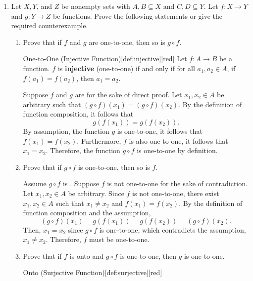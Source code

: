 \begin{enumerate} 
  \item Let $X, Y$, and $Z$ be nonempty sets with $A, B \subseteq X$ and $C, D \subseteq Y$. 
  Let $f: X \rightarrow Y$ and $g: Y \rightarrow Z$ be functions. 
  Prove the following statements or give the required counterexample.
  \begin{enumerate}
    \item Prove that if $f$ and $g$ are one-to-one, then so is $g \circ f$.
    \begin{define}{One-to-One (Injective Function)}[def:injective][red]
      Let $f : A \to B$ be a function. $f$ is \textbf{injective} (one-to-one) if and only if for all $a_1, a_2 \in A$, if $f(a_1) = f(a_2)$, then $a_1 = a_2$.
    \end{define}
    \begin{subprove}
      Suppose $f$ and $g$ are  for the sake of direct proof.\proofstep
      Let $x_1, x_2 \in A$ be arbitrary such that $(g \circ f)(x_1) = (g \circ f)(x_2)$.
      By the definition of function composition, it follows that $$g(f(x_1)) = g(f(x_2)).$$
      By assumption, the function $g$ is one-to-one, it follows that $f(x_1) = f(x_2)$.
      Furthermore, $f$ is also one-to-one, it follows that $x_1 = x_2$.\proofstep
      Therefore, the function $g \circ f$ is one-to-one by definition.
    \end{subprove}
    \item Prove that if $g \circ f$ is one-to-one, then so is $f$.
    \begin{subprove}
      Assume $g \circ f$ is . Suppose $f$ is not one-to-one 
      for the sake of contradiction. \proofstep
      Let $x_1, x_2 \in A$ be arbitrary. Since $f$ is not one-to-one, 
      there exist $x_1, x_2 \in A$ such that $x_1 \neq x_2$ and $f(x_1) = f(x_2)$. 
      By the definition of function composition and the assumption, $$(g \circ f)(x_1) = g(f(x_1)) = g(f(x_2)) = (g \circ f)(x_2).$$
      Then, $x_1 = x_2$ since $g \circ f$ is one-to-one, which contradicts the assumption, $x_1 \neq x_2$. Therefore, $f$ must be one-to-one.
    \end{subprove}
    \newpage
    \item Prove that if $f$ is onto and $g \circ f$ is one-to-one, then $g$ is one-to-one.
    \begin{define}{Onto (Surjective Function)}[def:surjective][red]

\end{define}
\end{enumerate}
\end{enumerate}
